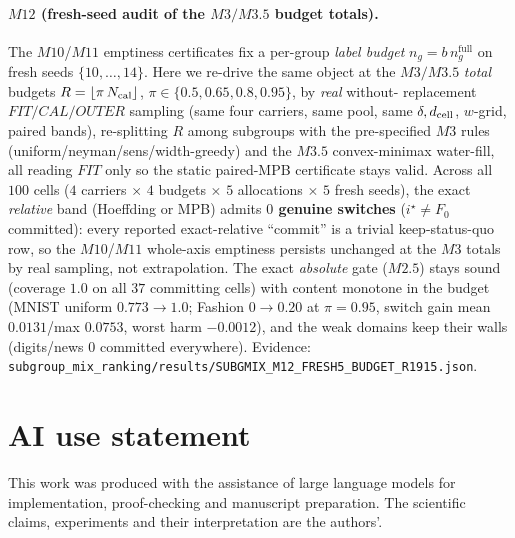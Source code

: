 \documentclass{article}
\begin{document}
\paragraph{$M12$ (fresh-seed audit of the $M3/M3.5$ budget totals).}
The $M10$/$M11$ emptiness certificates fix a per-group \emph{label budget} $n_g=b\,n_g^{\mathrm{full}}$
on fresh seeds $\{10,\dots,14\}$. Here we re-drive the same object at the $M3/M3.5$ \emph{total}
budgets $R=\lfloor\pi\,N_{\rm cal}\rfloor$, $\pi\in\{0.5,0.65,0.8,0.95\}$, by \emph{real} without-
replacement $FIT/CAL/OUTER$ sampling (same four carriers, same pool, same $\delta,d_{\rm cell}$,
$w$-grid, paired bands), re-splitting $R$ among subgroups with the pre-specified $M3$ rules
(uniform/neyman/sens/width-greedy) and the $M3.5$ convex-minimax water-fill, all reading $FIT$ only so
the static paired-MPB certificate stays valid. Across all $100$ cells
($4$ carriers $\times$ $4$ budgets $\times$ $5$ allocations $\times$ $5$ fresh seeds), the exact
\emph{relative} band (Hoeffding or MPB) admits \textbf{$0$ genuine switches} ($i^\star\!\ne\!F_0$
committed): every reported exact-relative ``commit'' is a trivial keep-status-quo row, so the $M10$/$
M11$ whole-axis emptiness persists unchanged at the $M3$ totals by real sampling, not extrapolation.
The exact \emph{absolute} gate ($M2.5$) stays sound (coverage $1.0$ on all $37$ committing cells) with
content monotone in the budget (MNIST uniform $0.773\!\to\!1.0$; Fashion $0\!\to\!0.20$ at $\pi{=}0.95$,
switch gain mean $0.0131$/max $0.0753$, worst harm $-0.0012$), and the weak domains keep their walls
(digits/news $0$ committed everywhere). Evidence:
\texttt{subgroup\_mix\_ranking/results/SUBGMIX\_M12\_FRESH5\_BUDGET\_R1915.json}.

\section{AI use statement}
This work was produced with the assistance of large language models for implementation,
proof-checking and manuscript preparation. The scientific claims, experiments and their
interpretation are the authors'.
\end{document}
